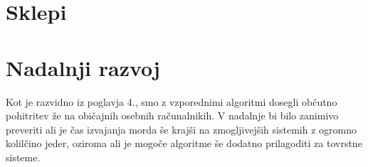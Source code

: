 \documentclass[a4paper,12pt,openright]{book}
\begin{document}
\section{Sklepi}

\section{Nadalnji razvoj}

Kot je razvidno iz poglavja 4., smo z vzporednimi algoritmi dosegli občutno pohitritev že na običajnih osebnih računalnikih. V nadalnje bi bilo zanimivo preveriti ali je čas izvajanja morda še krajši na zmogljivejših sistemih z ogromno kolilčino jeder, oziroma ali je mogoče algoritme še dodatno prilagoditi za tovrstne sisteme. 



\raggedright




\printbibliography[heading=bibintoc,title={Literatura}]
\end{document}
